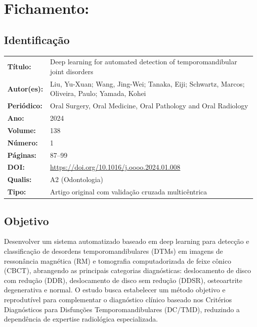 \section{Fichamento: }

\subsection{Identificação}
\begin{tabular}{ll}
\textbf{Título:} & Deep learning for automated detection of temporomandibular
joint disorders \\
\textbf{Autor(es):} & Liu, Yu-Xuan; Wang, Jing-Wei; Tanaka, Eiji;
Schwartz, Marcos; Oliveira, Paulo; Yamada, Kohei \\
\textbf{Periódico:} & Oral Surgery, Oral Medicine, Oral Pathology and Oral Radiology \\
\textbf{Ano:} & 2024 \\
\textbf{Volume:} & 138 \\
\textbf{Número:} & 1 \\
\textbf{Páginas:} & 87--99 \\
\textbf{DOI:} & \url{https://doi.org/10.1016/j.oooo.2024.01.008} \\
\textbf{Qualis:} & A2 (Odontologia) \\
\textbf{Tipo:} & Artigo original com validação cruzada multicêntrica \\
\end{tabular}

\subsection{Objetivo}
Desenvolver um sistema automatizado baseado em deep learning para detecção
e classificação de desordens temporomandibulares (DTMs) em imagens de
ressonância magnética (RM) e tomografia computadorizada de feixe cônico
(CBCT), abrangendo as principais categorias diagnósticas: deslocamento de
disco com redução (DDR), deslocamento de disco sem redução (DDSR),
osteoartrite degenerativa e normal. O estudo busca estabelecer um método
objetivo e reprodutível para complementar o diagnóstico clínico baseado
nos Critérios Diagnósticos para Disfunções Temporomandibulares
(DC/TMD), reduzindo a dependência de expertise radiológica especializada.

